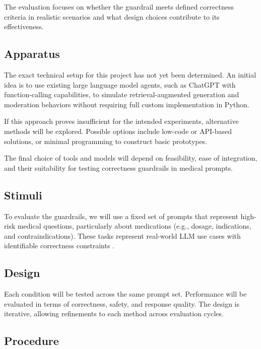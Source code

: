 \documentclass[a4paper,doc,natbib]{apa6}
\begin{document}
    The evaluation focuses on whether the guardrail meets defined correctness criteria in realistic scenarios and what design choices contribute to its effectiveness.

    \subsection{Apparatus}

    The exact technical setup for this project has not yet been determined. An initial idea is to use existing large language model agents, such as ChatGPT with function-calling capabilities, to simulate retrieval-augmented generation and moderation behaviors without requiring full custom implementation in Python.

    If this approach proves insufficient for the intended experiments, alternative methods will be explored. Possible options include low-code or API-based solutions, or minimal programming to construct basic prototypes.

    The final choice of tools and models will depend on feasibility, ease of integration, and their suitability for testing correctness guardrails in medical prompts.

    \subsection{Stimuli}

    To evaluate the guardrails, we will use a fixed set of prompts that represent high-risk medical questions, particularly about medications (e.g., dosage, indications, and contraindications).
    These tasks represent real-world LLM use cases with identifiable correctness constraints \citep{pais2024medication}.

    \subsection{Design}

    Each condition will be tested across the same prompt set. Performance will be evaluated in terms of correctness, safety, and response quality. The design is iterative, allowing refinements to each method across evaluation cycles.

    \subsection{Procedure}
\end{document}
